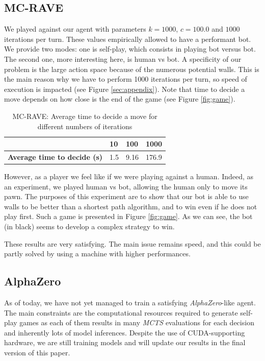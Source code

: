 \documentclass[journal, a4paper]{IEEEtran}
\begin{document}
\subsection{MC-RAVE}
We played against our agent with parameters $k=1000$, $c=100.0$ and $1000$ iterations per turn. These values empirically allowed to have a performant bot. We provide two modes: one is self-play, which consists in playing bot versus bot. The second one, more interesting here, is human vs bot. A specificity of our problem is the large action space because of the numerous potential walls. This is the main reason why we have to perform 1000 iterations per turn, so speed of execution is impacted (see Figure \ref{sec:appendix}). Note that time to decide a move depends on how close is the end of the game (see Figure \ref{fig:game}).

\begin{table}[h]
        \centering
        \begin{tabular}{llll}
            \toprule
            & 10 & 100 & 1000 \\
            \midrule
            \textbf{Average time to decide (s)} & 1.5 & 9.16 & 176.9 \\
            \bottomrule
        \end{tabular}
    \caption{MC-RAVE: Average time to decide a move for different numbers of iterations}
    \label{tab:execution_time}
    \end{table}

However, as a player we feel like if we were playing against a human. Indeed, as an experiment, we played human vs bot, allowing the human only to move its pawn. The purposes of this experiment are to show that our bot is able to use walls to be better than a shortest path algorithm, and to win even if he does not play first. Such a game is presented in Figure \ref{fig:game}. As we can see, the bot (in black) seems to develop a complex strategy to win.

These results are very satisfying. The main issue remains speed, and this could be partly solved by using a machine with higher performances.

\subsection{AlphaZero}
As of today, we have not yet managed to train a satisfying \textit{AlphaZero}-like agent. The main constraints are the computational resources required to generate self-play games as each of them results in many \textit{MCTS} evaluations for each decision and inherently lots of model inferences. Despite the use of CUDA-supporting hardware, we are still training models and will update our results in the final version of this paper.
\end{document}

